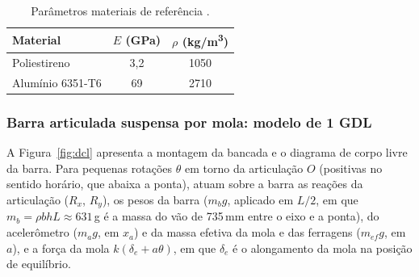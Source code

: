 \documentclass[a4paper,10pt,twocolumn]{article}
\begin{document}
\begin{table}[H]
    \centering
    \caption{Parâmetros materiais de referência \cite{Callister2014, ASM1990}.}
    \label{tab:parametros_materiais}
    \small
    \begin{tabularx}{\columnwidth}{X c c}
        \toprule
        \textbf{Material} & \textbf{$E$ (GPa)} & \textbf{$\rho$ (kg/m\textsuperscript{3})} \\
        \midrule
        Poliestireno  & 3{,}2 & 1050 \\
        Alumínio 6351-T6 & 69 & 2710 \\
        \bottomrule
    \end{tabularx}
\end{table}

\subsubsection{Barra articulada suspensa por mola: modelo de 1 GDL}
\label{sec:modelo_1gdl}

A Figura~\ref{fig:dcl} apresenta a montagem da bancada e o diagrama de corpo livre da barra. Para pequenas rotações $\theta$ em torno da articulação $O$ (positivas no sentido horário, que abaixa a ponta), atuam sobre a barra as reações da articulação ($R_x$, $R_y$), os pesos da barra ($m_b g$, aplicado em $L/2$, em que $m_b = \rho b h L \approx 631$\,g é a massa do vão de 735\,mm entre o eixo e a ponta), do acelerômetro ($m_a g$, em $x_a$) e da massa efetiva da mola e das ferragens ($m_{ef} g$, em $a$), e a força da mola $k(\delta_e + a\theta)$, em que $\delta_e$ é o alongamento da mola na posição de equilíbrio.
\end{document}
